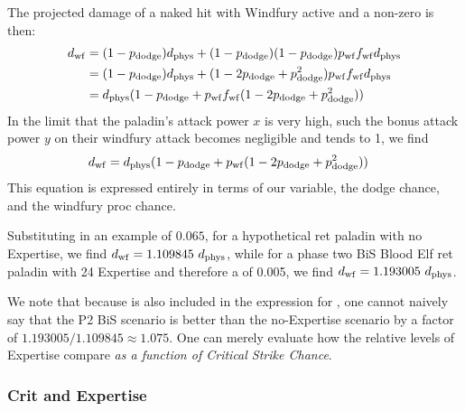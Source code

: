 \documentclass[letterpaper,11pt]{article}
\begin{document}
	The projected damage of a naked hit with Windfury active and a non-zero \pdodge is then:
	\begin{equation*}
	\begin{aligned}
		d_\mathrm{wf} &= (1 - p_{\mathrm{dodge}} ) d_{\mathrm{phys}}  + (1 - p_{\mathrm{dodge}} ) (1 - p_{\mathrm{dodge}} ) p_{\mathrm{wf}}  f_{\mathrm{wf}}  d_{\mathrm{phys}} \\
				    &= (1 - p_{\mathrm{dodge}} ) d_{\mathrm{phys}}  + (1 - 2p_{\mathrm{dodge}}  + p_{\mathrm{dodge}} ^2) p_{\mathrm{wf}}  f_{\mathrm{wf}}  d_{\mathrm{phys}}  \\
				    &= d_{\mathrm{phys}} (1 - p_{\mathrm{dodge}}  + p_{\mathrm{wf}} f_{\mathrm{wf}} (1 - 2p_{\mathrm{dodge}}  + p_{\mathrm{dodge}} ^2))
		\end{aligned}
	\end{equation*}
	In the limit that the paladin's attack power $x$ is very high, such the bonus attack power $y$ on their windfury attack becomes negligible and \fwf tends to 1, we find
	\begin{equation*}
		\begin{aligned}
			d_\mathrm{wf}  &= d_{\mathrm{phys}} (1 - p_{\mathrm{dodge}}  + p_{\mathrm{wf}} (1 - 2p_{\mathrm{dodge}}  + p_{\mathrm{dodge}} ^2))
		\end{aligned}
	\end{equation*}
	This equation is expressed entirely in terms of our \dphys variable, the dodge chance, and the windfury proc chance.
	
	Substituting in an example \pdodge of $0.065$, for a hypothetical ret paladin with no Expertise, we find $d_\mathrm{wf} = 1.109845~d_{\mathrm{phys}} $, while for a phase two BiS Blood Elf ret paladin with 24 Expertise and therefore a \pdodge of 0.005, we find $d_\mathrm{wf} = 1.193005~d_{\mathrm{phys}} $.
			
	We note that because \pdodge is also included in the expression for \dphys, one cannot naively say that the P2 BiS scenario is better than the no-Expertise scenario by a factor of $1.193005/1.109845 \approx 1.075$.
	One can merely evaluate how the relative levels of Expertise compare \emph{as a function of Critical Strike Chance}.
	
	\subsubsection{Crit and Expertise}
	
\end{document}
